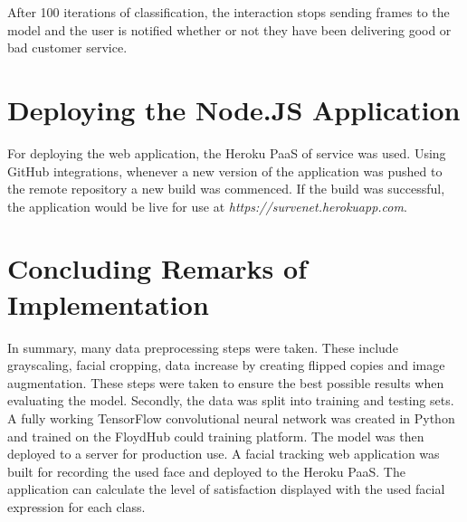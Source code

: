After 100 iterations of classification, the interaction stops sending frames to the model and the user is notified whether or not they have been delivering good or bad customer service.



\section{Deploying the Node.JS Application}


For deploying the web application, the Heroku PaaS of service was used. Using GitHub integrations, whenever a new version of the application was pushed to the remote repository a new build was commenced. If the build was successful, the application would be live for use at \textit{https://survenet.herokuapp.com}.

\section{Concluding Remarks of Implementation}

In summary, many data preprocessing steps were taken. These include grayscaling, facial cropping, data increase by creating flipped copies and image augmentation. These steps were taken to ensure the best possible results when evaluating the model. Secondly, the data was split into training and testing sets. A fully working TensorFlow convolutional neural network was created in Python and trained on the FloydHub could training platform. The model was then deployed to a server for production use. A facial tracking web application was built for recording the used face and deployed to the Heroku PaaS. The application can calculate the level of satisfaction displayed with the used facial expression for each class.



